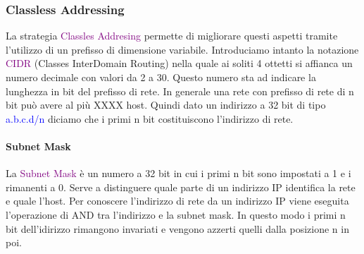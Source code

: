 \subsubsection{Classless Addressing}
La strategia \textcolor{purple}{Classles Addresing} permette di migliorare questi aspetti tramite l'utilizzo di un prefisso di dimensione variabile.
Introduciamo intanto la notazione \textcolor{purple}{CIDR} (Classes InterDomain Routing) nella quale ai soliti 4 ottetti si affianca un numero decimale con valori da 2 a 30.
Questo numero sta ad indicare la lunghezza in bit del prefisso di rete. In generale una rete con prefisso di rete di n bit può avere al più XXXX host.
Quindi dato un indirizzo a 32 bit di tipo \textcolor{blue}{a.b.c.d/n} diciamo che i primi n bit costituiscono l'indirizzo di rete.

\paragraph{Subnet Mask}
La \textcolor{purple}{Subnet Mask} è un numero a 32 bit in cui i primi n bit sono impostati a 1 e i rimanenti a 0. Serve a distinguere quale parte di un indirizzo IP identifica la rete e quale l'host.
Per conoscere l'indirizzo di rete da un indirizzo IP viene eseguita l'operazione di AND tra l'indirizzo e la subnet mask. In questo modo i primi n bit dell'idirizzo rimangono invariati e vengono azzerti quelli dalla posizione n in poi.